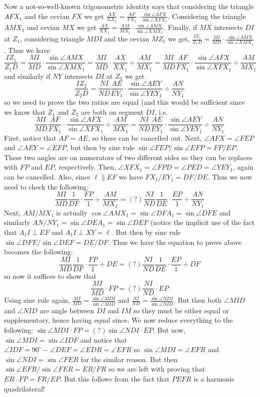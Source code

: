 \documentclass[11pt,a4paper]{article}
\newcommand{\<}{\langle}
\renewcommand{\>}{\rangle}
\begin{document}
\begin{enumerate}
	Now a not-so-well-known trigonometric identity says that considering the triangle $AFX_1$ and the cevian $FX$ we get $\frac{AX}{XX_1}=\frac{AF}{FX_1}\cdot \frac{\sin\angle AFX}{\sin\angle XFX_1}$. Considering the triangle $AMX_1$ and cevian $MX$ we get $\frac{AX}{XX_1}=\frac{AM}{MX_1}\cdot \frac{\sin\angle AMX}{\sin\angle XMX_1}$. Finally, if $MX$ intersects $DI$ at $Z_1$, considering triangle $MDI$ and the cevian $MZ_1$ we get, $\frac{IZ_1}{Z_1D}=\frac{MI}{MD}\cdot \frac{\sin\angle AMX}{\sin\angle XMX_1}$. Thus we have
	\[
	\frac{IZ_1}{Z_1D}=\frac{MI}{MD}\cdot \frac{\sin\angle AMX}{\sin\angle XMX_1}
	=\frac{MI}{MD}\cdot \frac{AX}{XX_1}\div \frac{AM}{MX_1}
	=\frac{MI}{MD}\frac{AF}{FX_1}\cdot \frac{\sin\angle AFX}{\sin\angle XFX_1}\div \frac{AM}{MX_1}
	\]and similarly if $NY$ intersects $DI$ at $Z_2$ we get
	\[
	\frac{IZ_2}{Z_2D}
	=\frac{NI}{ND}\frac{AE}{EY_1}\cdot \frac{\sin\angle AEY}{\sin\angle YEY_1}\div \frac{AN}{NY_1}
	\]so we need to prove the two ratios are equal (and this would be sufficient since we know that $Z_1$ and $Z_2$ are both on segment $DI$, i.e.
	\[
	\frac{MI}{MD}\frac{AF}{FX_1}\cdot \frac{\sin\angle AFX}{\sin\angle XFX_1}\div \frac{AM}{MX_1}
	=\frac{NI}{ND}\frac{AE}{EY_1}\cdot \frac{\sin\angle AEY}{\sin\angle YEY_1}\div \frac{AN}{NY_1}
	\]First, notice that $AF=AE$, so these can be cancelled out. Next, $\angle AFX=\angle FEP$ and $\angle AEY=\angle EFP$, but then by sine rule $\sin\angle FEP/\sin\angle EFP=FP/EP$. These two angles are on numerators of two different sides so they can be replaces with $FP$ and $EP$, respectively. Then, $\angle XFX_1=\angle FPD=\angle PED = \angle YEY_1$, again can be cancelled.
	Also, since $\ell\parallel EF$ we have $FX_1/EY_1=DF/DE$.
	Thus we now need to check the following:
	\[
	\frac{MI}{MD}\frac{1}{DF}\cdot \frac{FP}{1}\div \frac{AM}{MX_1}
	=(?)\frac{NI}{ND}\frac{1}{DE}\cdot \frac{EP}{1}\div \frac{AN}{NY_1}
	\]Next, $AM/MX_1$ is actually $\cos \angle AMX_1=\sin \angle DFA_1=\sin\angle DFE$ and similarly $AN/NY_1=\sin \angle DEA_1=\sin\angle DEF$ (notice the implicit use of the fact that $A_1I\perp EF$ and $A_1I\perp XY=\ell$. But then by sine rule $\sin\angle DFE/\sin\angle DEF=DE/DF$. Thus we have the equation to prove above becomes the following:
	\[
	\frac{MI}{MD}\frac{1}{DF}\cdot \frac{FP}{1}\div DE
	=(?)\frac{NI}{ND}\frac{1}{DE}\cdot \frac{EP}{1}\div DF
	\]so now it suffices to show that
	\[
	\frac{MI}{MD}\cdot FP
	=(?)\frac{NI}{ND}\cdot EP
	\]Using sine rule again, $\frac{MI}{MD}=\frac{\sin\angle MDI}{\sin\angle MID}$ and $\frac{NI}{ND}=\frac{\sin\angle NDI}{\sin\angle NID}$. But then both $\angle MID$ and $\angle NID$ are angle between $DI$ and $IM$ so they must be either equal or supplementary, hence having equal since. We now reduce everything to the following: $\sin\angle MDI\cdot FP=(?)\sin\angle NDI\cdot EP$.
	But now, $\sin\angle MDI=\sin\angle IDF$ and notice that $\angle IDF=90^{\circ}-\angle DEF=\angle EDR=\angle EFR$ so $\sin\angle MDI=\angle EFR$ and $\sin\angle NDI=\sin\angle FER$ for the similar reason. But then $\sin\angle EFR/\sin\angle FER = ER/FR$ so we are left with proving that $ER\cdot FP=FR/ EP$. But this follows from the fact that $PEFR$ is a harmonic quadrilateral!
\end{enumerate}
\end{document}

